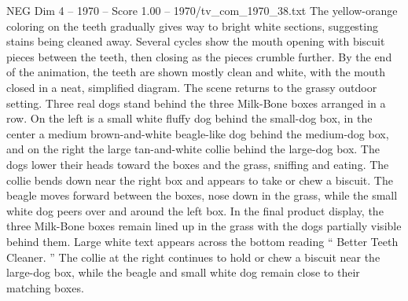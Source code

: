 \begin{textsample}{NEG Dim 4 – 1970 – Score 1.00 – 1970/tv\_com\_1970\_38.txt}
The yellow-orange coloring on the teeth gradually gives way to bright white sections, suggesting stains being cleaned away.
Several cycles show the mouth opening with biscuit pieces between the teeth, then closing as the pieces crumble further.
By the end of the animation, the teeth are shown mostly clean and white, with the mouth closed in a neat, simplified diagram.
The scene returns to the grassy outdoor setting.
Three real dogs stand behind the three Milk-Bone boxes arranged in a row.
On the left is a small white fluffy dog behind the small-dog box, in the center a medium brown-and-white beagle-like dog behind the medium-dog box, and on the right the large tan-and-white collie behind the large-dog box.
The dogs lower their heads toward the boxes and the grass, sniffing and eating.
The collie bends down near the right box and appears to take or chew a biscuit.
The beagle moves forward between the boxes, nose down in the grass, while the small white dog peers over and around the left box.
In the final product display, the three Milk-Bone boxes remain lined up in the grass with the dogs partially visible behind them.
Large white text appears across the bottom reading “ Better Teeth Cleaner. ” The collie at the right continues to hold or chew a biscuit near the large-dog box, while the beagle and small white dog remain close to their matching boxes.

\end{textsample}

